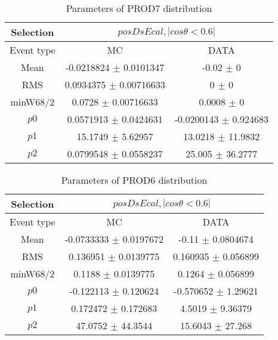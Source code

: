 \documentclass[a4paper,12pt]{article}
\begin{document}
\begin{table}[htbp]
\begin{center}
\begin{tabular}{|c|c|c|}
        \hline
        Selection & \multicolumn{2}{|c|}{$posDsEcal, |cos\theta<0.6|$}  \\ \hline
        Event type & MC & DATA \\ 
        \hline
        Mean & -0.0218824 $\pm$ 0.0101347 & -0.02 $\pm$ 0 \\ 
        \hline 
        RMS & 0.0934375 $\pm$ 0.00716633 & 0 $\pm$ 0 \\ 
        \hline 
        minW68/2 & 0.0728 $\pm$ 0.00716633 & 0.0008 $\pm$ 0 \\ 
        \hline 
        $p0$ & 0.0571913 $\pm$ 0.0424631 & -0.0200143 $\pm$ 0.924683 \\ 
        \hline 
        $p1$ & 15.1749 $\pm$ 5.62957 & 13.0218 $\pm$ 11.9832 \\ 
        \hline 
        $p2$ & 0.0799548 $\pm$ 0.0558237 & 25.005 $\pm$ 36.2777 \\ 
        \hline 
\end{tabular}
\caption{Parameters of PROD7 distribution } \vspace{0.2in}
\label{xxx}
\end{center}
\end{table}
\begin{table}[htbp]
\begin{center}
\begin{tabular}{|c|c|c|}
        \hline
        Selection & \multicolumn{2}{|c|}{$posDsEcal, |cos\theta<0.6|$}  \\ \hline
        Event type & MC & DATA \\ 
        \hline
        Mean & -0.0733333 $\pm$ 0.0197672 & -0.11 $\pm$ 0.0804674 \\ 
        \hline 
        RMS & 0.136951 $\pm$ 0.0139775 & 0.160935 $\pm$ 0.056899 \\ 
        \hline 
        minW68/2 & 0.1188 $\pm$ 0.0139775 & 0.1264 $\pm$ 0.056899 \\ 
        \hline 
        $p0$ & -0.122113 $\pm$ 0.120624 & -0.570652 $\pm$ 1.29621 \\ 
        \hline 
        $p1$ & 0.172472 $\pm$ 0.172683 & 4.5019 $\pm$ 9.36379 \\ 
        \hline 
        $p2$ & 47.0752 $\pm$ 44.3544 & 15.6043 $\pm$ 27.268 \\ 
        \hline 
\end{tabular}
\caption{Parameters of PROD6 distribution } \vspace{0.2in}
\label{xxx}
\end{center}
\end{table}
\end{document}
